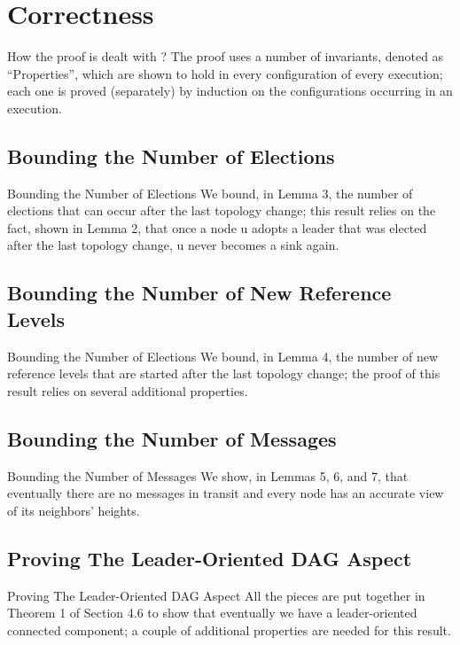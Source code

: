 \documentclass{beamer}
\begin{document}
\section{Correctness}
\begin{frame}{How the proof is dealt with ?}
	The proof uses a number of invariants, denoted as “Properties”, which are shown to hold in every configuration of every execution; each one is proved (separately) by induction on the configurations occurring in an execution.
\end{frame}


\subsection{Bounding the Number of Elections}

\begin{frame}{Bounding the Number of Elections}
	We bound, in Lemma 3, the number of elections that can occur after the last topology change; this result relies on the fact, shown in Lemma 2, that once a node u adopts a leader that was elected after the last topology change, u never becomes a sink again.
\end{frame}

\subsection{Bounding the Number of New Reference Levels}
\begin{frame}{Bounding the Number of Elections}
We bound, in Lemma 4, the number of new reference levels that are started after the last topology change; the proof of this result relies on several additional properties.
\end{frame}
\subsection{Bounding the Number of Messages}
\begin{frame}{Bounding the Number of Messages}
We show, in Lemmas 5, 6, and 7, that eventually there are no messages in transit and every node has an accurate view of its neighbors’ heights.
\end{frame}
\subsection{Proving The Leader-Oriented DAG Aspect}
\begin{frame}{Proving The Leader-Oriented DAG Aspect}
All the pieces are put together in Theorem 1 of Section 4.6 to show that eventually we have a leader-oriented connected component; a couple of additional properties are needed for this result.
\end{frame}
\end{document}

